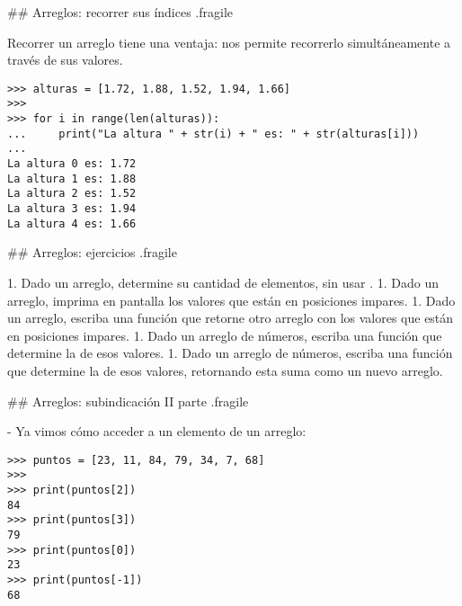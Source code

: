 \trmcolumns

## Arreglos: recorrer sus índices {.fragile}

\bgnblockidea
\footnotesize
Recorrer un arreglo  tiene una ventaja: nos
permite recorrerlo simultáneamente a través de sus valores.
\trmblockidea



\begin{lstlisting}[style=frame03]
>>> alturas = [1.72, 1.88, 1.52, 1.94, 1.66]
>>>
>>> for i in range(len(alturas)):
...     print("La altura " + str(i) + " es: " + str(alturas[i]))
... 
La altura 0 es: 1.72
La altura 1 es: 1.88
La altura 2 es: 1.52
La altura 3 es: 1.94
La altura 4 es: 1.66
\end{lstlisting}


## Arreglos: ejercicios {.fragile}

1. Dado un arreglo, determine su cantidad de elementos, sin usar .
1. Dado un arreglo, imprima en pantalla los valores que están en posiciones impares.
1. Dado un arreglo, escriba una función que retorne otro arreglo con los valores que están en posiciones impares.
1. Dado un arreglo de números, escriba una función que determine la  de esos valores.
1. Dado un arreglo de números, escriba una función que determine la  de esos valores, retornando esta suma como un nuevo arreglo.

## Arreglos: subindicación II parte {.fragile}

- Ya vimos cómo acceder a un elemento de un arreglo:


\vfill

\bgncolumns
{}

\begin{lstlisting}[style=frame03]
>>> puntos = [23, 11, 84, 79, 34, 7, 68]
>>>
>>> print(puntos[2])
84
>>> print(puntos[3])
79
>>> print(puntos[0])
23
>>> print(puntos[-1])
68
\end{lstlisting}


\pause

